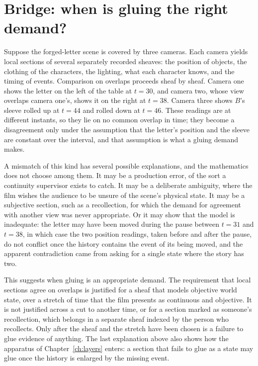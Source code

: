 \section{Bridge: when is gluing the right demand?}

Suppose the forged-letter scene is covered by three cameras. Each camera yields local sections of several separately recorded sheaves: the position of objects, the clothing of the characters, the lighting, what each character knows, and the timing of events. Comparison on overlaps proceeds sheaf by sheaf. Camera one shows the letter on the left of the table at $t=30$, and camera two, whose view overlaps camera one's, shows it on the right at $t=38$. Camera three shows $B$'s sleeve rolled up at $t=44$ and rolled down at $t=46$. These readings are at different instants, so they lie on no common overlap in time; they become a disagreement only under the assumption that the letter's position and the sleeve are constant over the interval, and that assumption is what a gluing demand makes.

A mismatch of this kind has several possible explanations, and the mathematics does not choose among them. It may be a production error, of the sort a continuity supervisor exists to catch. It may be a deliberate ambiguity, where the film wishes the audience to be unsure of the scene's physical state. It may be a subjective section, such as a recollection, for which the demand for agreement with another view was never appropriate. Or it may show that the model is inadequate: the letter may have been moved during the pause between $t=31$ and $t=38$, in which case the two position readings, taken before and after the pause, do not conflict once the history contains the event of its being moved, and the apparent contradiction came from asking for a single state where the story has two.

This suggests when gluing is an appropriate demand. The requirement that local sections agree on overlaps is justified for a sheaf that models objective world state, over a stretch of time that the film presents as continuous and objective. It is not justified across a cut to another time, or for a section marked as someone's recollection, which belongs in a separate sheaf indexed by the person who recollects. Only after the sheaf and the stretch have been chosen is a failure to glue evidence of anything. The last explanation above also shows how the apparatus of Chapter~\ref{ch:layers} enters: a section that fails to glue as a state may glue once the history is enlarged by the missing event.

